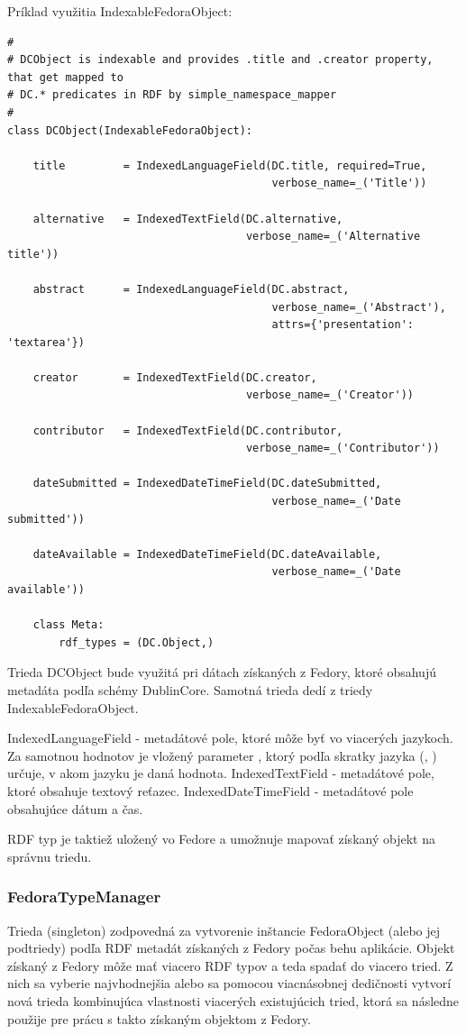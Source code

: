 \documentclass[thesis=M,slovak]{FITthesis}[2013/05/06]
\begin{document}
Príklad využitia IndexableFedoraObject:
\begin{lstlisting}[frame=single] 
#
# DCObject is indexable and provides .title and .creator property, that get mapped to
# DC.* predicates in RDF by simple_namespace_mapper
#
class DCObject(IndexableFedoraObject):

    title         = IndexedLanguageField(DC.title, required=True,
                                         verbose_name=_('Title'))

    alternative   = IndexedTextField(DC.alternative,
                                     verbose_name=_('Alternative title'))

    abstract      = IndexedLanguageField(DC.abstract,
                                         verbose_name=_('Abstract'),
                                         attrs={'presentation': 'textarea'})

    creator       = IndexedTextField(DC.creator,
                                     verbose_name=_('Creator'))

    contributor   = IndexedTextField(DC.contributor,
                                     verbose_name=_('Contributor'))

    dateSubmitted = IndexedDateTimeField(DC.dateSubmitted,
                                         verbose_name=_('Date submitted'))

    dateAvailable = IndexedDateTimeField(DC.dateAvailable,
                                         verbose_name=_('Date available'))

    class Meta:
        rdf_types = (DC.Object,)
\end{lstlisting}

Trieda DCObject bude využitá pri dátach získaných z Fedory, ktoré obsahujú metadáta podľa schémy DublinCore. Samotná trieda dedí z triedy IndexableFedoraObject.

IndexedLanguageField - metadátové pole, ktoré môže byť vo viacerých jazykoch. Za samotnou hodnotov je vložený parameter , ktorý podľa skratky jazyka (, ) určuje, v akom jazyku je daná hodnota.
IndexedTextField - metadátové pole, ktoré obsahuje textový reťazec.
IndexedDateTimeField - metadátové pole obsahujúce dátum a čas.

RDF typ je taktiež uložený vo Fedore a umožnuje mapovať získaný objekt na správnu triedu.

\subsubsection{FedoraTypeManager}
Trieda (singleton) zodpovedná za vytvorenie inštancie FedoraObject (alebo jej podtriedy) podľa RDF metadát získaných z Fedory počas behu aplikácie. Objekt získaný z Fedory môže mať viacero RDF typov a teda spadať do viacero tried. Z nich sa vyberie najvhodnejšia alebo sa pomocou viacnásobnej dedičnosti vytvorí nová trieda kombinujúca vlastnosti viacerých existujúcich tried,  ktorá sa následne použije pre prácu s takto získaným objektom z Fedory.
\end{document}
